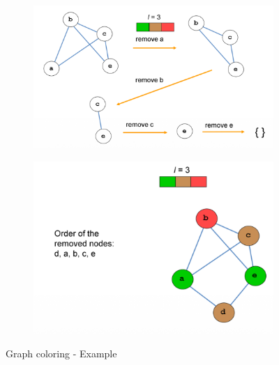 \begin{figure}[ht]
	\begin{center}
		\begin{subfigure}[b]{0.5\textwidth}
			\includegraphics[width=\textwidth]{images/Register_conflict_graph_3.png}
		\end{subfigure}
		\hfill
		\begin{subfigure}[b]{0.4\textwidth}
			\includegraphics[width=\textwidth]{images/Register_conflict_graph_4.png}	
		\end{subfigure}
		\caption{Graph coloring - Example}
		\label{fig:graph_coloring}
	\end{center}
\end{figure}

